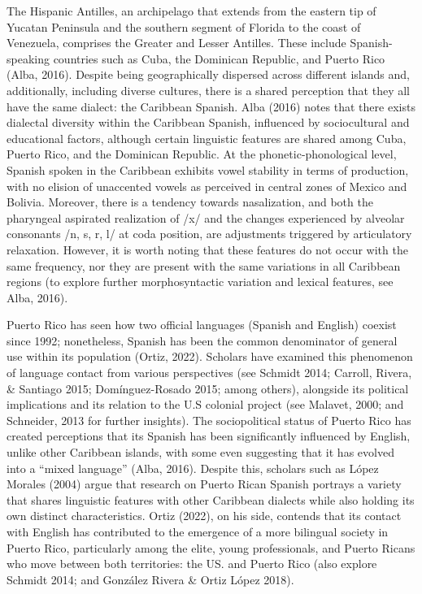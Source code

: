 \documentclass[
  a4paper,
  11pt,
  twocolumn]{article}
\begin{document}
The Hispanic Antilles, an archipelago that extends from the eastern tip
of Yucatan Peninsula and the southern segment of Florida to the coast of
Venezuela, comprises the Greater and Lesser Antilles. These include
Spanish-speaking countries such as Cuba, the Dominican Republic, and
Puerto Rico (Alba, 2016). Despite being geographically dispersed across
different islands and, additionally, including diverse cultures, there
is a shared perception that they all have the same dialect: the
Caribbean Spanish. Alba (2016) notes that there exists dialectal
diversity within the Caribbean Spanish, influenced by sociocultural and
educational factors, although certain linguistic features are shared
among Cuba, Puerto Rico, and the Dominican Republic. At the
phonetic-phonological level, Spanish spoken in the Caribbean exhibits
vowel stability in terms of production, with no elision of unaccented
vowels as perceived in central zones of Mexico and Bolivia. Moreover,
there is a tendency towards nasalization, and both the pharyngeal
aspirated realization of /x/ and the changes experienced by alveolar
consonants /n, s, r, l/ at coda position, are adjustments triggered by
articulatory relaxation. However, it is worth noting that these features
do not occur with the same frequency, nor they are present with the same
variations in all Caribbean regions (to explore further morphosyntactic
variation and lexical features, see Alba, 2016).

Puerto Rico has seen how two official languages (Spanish and English)
coexist since 1992; nonetheless, Spanish has been the common denominator
of general use within its population (Ortiz, 2022). Scholars have
examined this phenomenon of language contact from various perspectives
(see Schmidt 2014; Carroll, Rivera, \& Santiago 2015; Domínguez-Rosado
2015; among others), alongside its political implications and its
relation to the U.S colonial project (see Malavet, 2000; and Schneider,
2013 for further insights). The sociopolitical status of Puerto Rico has
created perceptions that its Spanish has been significantly influenced
by English, unlike other Caribbean islands, with some even suggesting
that it has evolved into a ``mixed language'' (Alba, 2016). Despite
this, scholars such as López Morales (2004) argue that research on
Puerto Rican Spanish portrays a variety that shares linguistic features
with other Caribbean dialects while also holding its own distinct
characteristics. Ortiz (2022), on his side, contends that its contact
with English has contributed to the emergence of a more bilingual
society in Puerto Rico, particularly among the elite, young
professionals, and Puerto Ricans who move between both territories: the
US. and Puerto Rico (also explore Schmidt 2014; and González Rivera \&
Ortiz López 2018).
\end{document}
